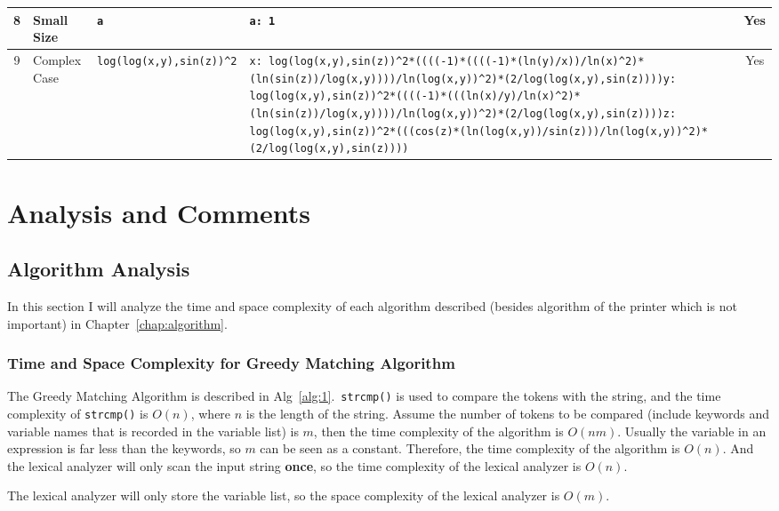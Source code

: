 \documentclass[a4paper,oneside]{book}
\begin{document}
\begin{longtable}{|c|p{3cm}|p{3.6cm}|p{3.6cm}|c|}
        8 & Small Size & \lstinline!a! & \lstinline!a: 1! & Yes \\ \hline
        9 & Complex Case & \lstinline!log(log(x,y),sin(z))^2! & \lstinline!x: log(log(x,y),sin(z))^2*((((-1)*((((-1)*(ln(y)/x))/ln(x)^2)*(ln(sin(z))/log(x,y))))/ln(log(x,y))^2)*(2/log(log(x,y),sin(z))))!\newline{}\lstinline!y: log(log(x,y),sin(z))^2*((((-1)*(((ln(x)/y)/ln(x)^2)*(ln(sin(z))/log(x,y))))/ln(log(x,y))^2)*(2/log(log(x,y),sin(z))))!\newline{}\lstinline!z: log(log(x,y),sin(z))^2*(((cos(z)*(ln(log(x,y))/sin(z)))/ln(log(x,y))^2)*(2/log(log(x,y),sin(z))))! & Yes \\ \hline
    \end{longtable}


\chapter{Analysis and Comments}

\section{Algorithm Analysis}

In this section I will analyze the time and space complexity of each algorithm described (besides algorithm of the printer which is not important) in Chapter~\ref{chap:algorithm}.

\subsection{Time and Space Complexity for Greedy Matching Algorithm}

The Greedy Matching Algorithm is described in Alg~\ref{alg:1}.~\verb|strcmp()| is used to compare the tokens with the string, and the time complexity of \verb|strcmp()| is $O(n)$, where $n$ is the length of the string. Assume the number of tokens to be compared (include keywords and variable names that is recorded in the variable list) is $m$, then the time complexity of the algorithm is $O(nm)$. Usually the variable in an expression is far less than the keywords, so $m$ can be seen as a constant. Therefore, the time complexity of the algorithm is $O(n)$. And the lexical analyzer will only scan the input string \textbf{once}, so the time complexity of the lexical analyzer is $O(n)$.

The lexical analyzer will only store the variable list, so the space complexity of the lexical analyzer is $O(m)$.
\end{document}
